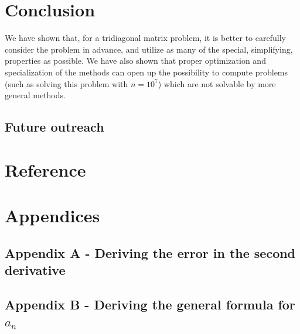 \documentclass[a4paper, 10pt]{article}
\begin{document}
\section{Conclusion}
We have shown that, for a tridiagonal matrix problem, it is better to carefully consider the problem in advance, and utilize as many of the special, simplifying, properties as possible. We have also shown that proper optimization and specialization of the methods can open up the possibility to compute problems (such as solving this problem with $n=10^7$) which are not solvable by more general methods.
\subsection{Future outreach}

\section{Reference}
\section{Appendices}
\subsection{Appendix A - Deriving the error in the second derivative}
\subsection{Appendix B - Deriving the general formula for $a_n$}
\end{document}
